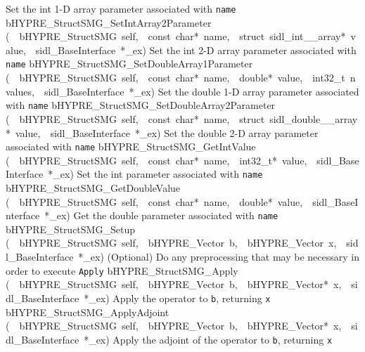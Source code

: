 \documentclass{article}
\begin{document}
\begin{cxxentry}
\begin{cxxentry}
\begin{cxxnames}
        {
Set the int 1-D array parameter associated with {\tt name}}
        {}
\label{cxx.7.4.20}
        {bHYPRE\_StructSMG\_SetIntArray2Parameter}
        {(\ \ bHYPRE\_StructSMG\ self,\ \ const\ char*\ name,\ \ struct\ sidl\_int\_\_array*\ value,\ \ sidl\_BaseInterface\ *\_ex)}
        {
Set the int 2-D array parameter associated with {\tt name}}
        {}
\label{cxx.7.4.21}
        {bHYPRE\_StructSMG\_SetDoubleArray1Parameter}
        {(\ \ bHYPRE\_StructSMG\ self,\ \ const\ char*\ name,\ \ double*\ value,\ \ int32\_t\ nvalues,\ \ sidl\_BaseInterface\ *\_ex)}
        {
Set the double 1-D array parameter associated with {\tt name}}
        {}
\label{cxx.7.4.22}
        {bHYPRE\_StructSMG\_SetDoubleArray2Parameter}
        {(\ \ bHYPRE\_StructSMG\ self,\ \ const\ char*\ name,\ \ struct\ sidl\_double\_\_array*\ value,\ \ sidl\_BaseInterface\ *\_ex)}
        {
Set the double 2-D array parameter associated with {\tt name}}
        {}
\label{cxx.7.4.23}
        {bHYPRE\_StructSMG\_GetIntValue}
        {(\ \ bHYPRE\_StructSMG\ self,\ \ const\ char*\ name,\ \ int32\_t*\ value,\ \ sidl\_BaseInterface\ *\_ex)}
        {
Set the int parameter associated with {\tt name}}
        {}
\label{cxx.7.4.24}
        {bHYPRE\_StructSMG\_GetDoubleValue}
        {(\ \ bHYPRE\_StructSMG\ self,\ \ const\ char*\ name,\ \ double*\ value,\ \ sidl\_BaseInterface\ *\_ex)}
        {
Get the double parameter associated with {\tt name}}
        {}
\label{cxx.7.4.25}
        {bHYPRE\_StructSMG\_Setup}
        {(\ \ bHYPRE\_StructSMG\ self,\ \ bHYPRE\_Vector\ b,\ \ bHYPRE\_Vector\ x,\ \ sidl\_BaseInterface\ *\_ex)}
        {
(Optional) Do any preprocessing that may be necessary in
order to execute {\tt Apply}}
        {}
\label{cxx.7.4.26}
        {bHYPRE\_StructSMG\_Apply}
        {(\ \ bHYPRE\_StructSMG\ self,\ \ bHYPRE\_Vector\ b,\ \ bHYPRE\_Vector*\ x,\ \ sidl\_BaseInterface\ *\_ex)}
        {
Apply the operator to {\tt b}, returning {\tt x}}
        {}
\label{cxx.7.4.27}
        {bHYPRE\_StructSMG\_ApplyAdjoint}
        {(\ \ bHYPRE\_StructSMG\ self,\ \ bHYPRE\_Vector\ b,\ \ bHYPRE\_Vector*\ x,\ \ sidl\_BaseInterface\ *\_ex)}
        {
Apply the adjoint of the operator to {\tt b}, returning {\tt x}}
        {}
\label{cxx.7.4.28}

\end{cxxnames}
\end{cxxentry}
\end{cxxentry}
\end{document}
